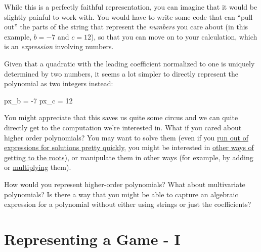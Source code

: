 \documentclass[
  letterpaper,
  DIV=11,
  numbers=noendperiod]{scrreprt}
\newenvironment{Shaded}{\begin{snugshade}}{\end{snugshade}}
\newcommand{\DecValTok}[1]{\textcolor[rgb]{0.68,0.00,0.00}{#1}}
\newcommand{\NormalTok}[1]{\textcolor[rgb]{0.00,0.23,0.31}{#1}}
\newcommand{\OperatorTok}[1]{\textcolor[rgb]{0.37,0.37,0.37}{#1}}
\begin{document}
While this is a perfectly faithful representation, you can imagine that
it would be slightly painful to work with. You would have to write some
code that can ``pull out'' the parts of the string that represent the
\emph{numbers} you care about (in this example, \(b = -7\) and
\(c = 12\)), so that you can move on to your calculation, which is an
\emph{expression} involving numbers.

Given that a quadratic with the leading coefficient normalized to one is
uniquely determined by two numbers, it seems a lot simpler to directly
represent the polynomial as two integers instead:

\begin{Shaded}
\begin{Highlighting}[]
\NormalTok{px\_b }\OperatorTok{=} \OperatorTok{{-}}\DecValTok{7}
\NormalTok{px\_c }\OperatorTok{=} \DecValTok{12}
\end{Highlighting}
\end{Shaded}

You might appreciate that this saves us quite some circus and we can
quite directly get to the computation we're interested in. What if you
cared about higher order polynomials? You may want to solve them (even
if you
\href{https://www.youtube.com/watch?t=2543\&v=O5eH3x3sTNA\&feature=youtu.be}{run
out of expressions for solutions pretty quickly}, you might be
interested in \href{https://math.stackexchange.com/a/1386830}{other ways
of getting to the roots}), or manipulate them in other ways (for
example, by adding or
\href{https://www.youtube.com/watch?v=h7apO7q16V0}{multiplying} them).

\begin{tcolorbox}[standard jigsaw,titlerule=0mm, leftrule=.75mm, colbacktitle=quarto-callout-caution-color!10!white, toptitle=1mm, toprule=.15mm, colframe=quarto-callout-caution-color-frame, colback=white, coltitle=black, title=\textcolor{quarto-callout-caution-color}{\faFire}\hspace{0.5em}{Food for thought.}, bottomrule=.15mm, rightrule=.15mm, bottomtitle=1mm, left=2mm, opacitybacktitle=0.6, arc=.35mm, opacityback=0]
How would you represent higher-order polynomials? What about
multivariate polynomials? Is there a way that you might be able to
capture an algebraic expression for a polynomial without either using
strings or just the coefficients?
\end{tcolorbox}

\hypertarget{representing-a-game---i}{%
\section{Representing a Game - I}\label{representing-a-game---i}}
\end{document}
